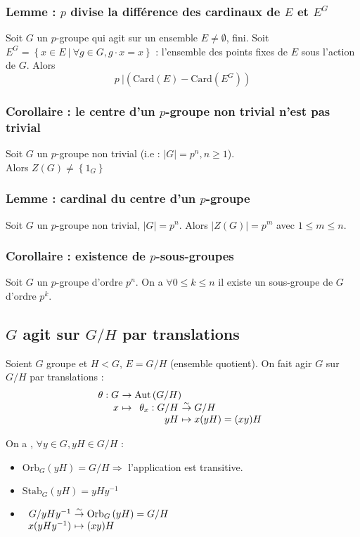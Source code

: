 \documentclass[a4paper,10pt]{report}
\newcommand{\set}[1]{\left\lbrace #1 \right\rbrace } %
\newcommand{\so}{\Rightarrow}
\newcommand{\bij}{\overset{\sim}{\to}} %
\newcommand{\Aut}[1]{\text{Aut}\left(#1\right)}
\newcommand{\Orb}[2]{\text{Orb}_{#1}\left( #2 \right)}
\newcommand{\Stab}[2]{\text{Stab}_{#1}\left( #2 \right)}
\newcommand{\Card}[1]{\text{Card}\left( #1 \right)}
\newcommand{\such}{\ \Big| \ }
\begin{document}
    \subsubsection{Lemme : $p$ divise la différence des cardinaux de $E$ et
    $E^G$}
     Soit $G$ un $p$-groupe qui agit sur un ensemble $E \neq \emptyset$, fini. Soit
     $E^G=\set{x\in E \such \forall g \in G, g\cdot x =x}$ : l'ensemble des
     points fixes de $E$ sous l'action de $G$. Alors
     $$p \ \Big|  \left(\Card{E} - \Card{E^G} \right)$$

    \subsubsection{Corollaire : le centre d'un $p$-groupe non trivial n'est pas
    trivial}
     Soit $G$ un $p$-groupe non trivial (i.e : $|G|=p^n, n \geq 1$).\\
     Alors $Z(G)\neq \set{1_G}$
 
    \subsubsection{Lemme : cardinal du centre d'un $p$-groupe}
     Soit $G$ un $p$-groupe non trivial, $|G|=p^n$. Alors $|Z(G)| = p^m$ avec
     $1 \leq m \leq n$.

    \subsubsection{Corollaire : existence de $p$-sous-groupes}
     Soit $G$ un $p$-groupe d'ordre $p^n$. On a $\forall 0 \leq k \leq n$ il
     existe un sous-groupe de $G$ d'ordre $p^k$.

   \subsection{$G$ agit sur $G/H$ par translations}
    Soient $G$ groupe et $H < G$, $E=G/H$ (ensemble quotient). On fait agir $G$
    sur $G/H$ par translations :
    $$
    \begin{array}[t]{r@{\ }l}
      \theta : G &\to \Aut{G/H}\\
      x &\mapsto 
      \begin{array}[t]{r@{\ }l}
	\theta_x : G/H &\bij G/H\\
	yH &\mapsto x(yH)=(xy)H
      \end{array}
    \end{array}$$

    On a , $\forall y \in G, yH \in G/H$ :
    \begin{itemize}
      \item $\Orb{G}{yH}=G/H \so $ l'application est transitive.
      \item $\Stab{G}{yH}=yHy^{-1}$
      \item $
	\begin{array}[t]{r@{\ }l}
	  G/yHy^{-1} &\bij \Orb{G}{yH}=G/H\\
	  x(yHy^{-1}) &\mapsto (xy)H
	\end{array}$	
    \end{itemize}
\end{document}
